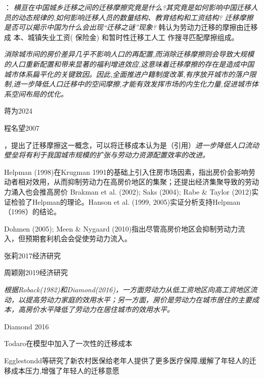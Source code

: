 \documentclass[a4paper,10pt]{article}
\begin{document}
\cite{HanQiHengNongCunLaoDongLiQianYiMoCaYingXiangNongMinGongShuLiangYuGongZiJieGouMa2018}：
\textit{横亘在中国城乡迁移之间的迁移摩擦究竟是什么?其究竟是如何影响中国迁移人员的动态规律的,如何影响迁移人员的数量结构、教育结构和工资结构? 迁移摩擦是否可以揭示中国为什么会出现“迁移之谜”现象?}
韩认为劳动力迁移的摩擦由迁移成 本、城镇失业工资( 保险金) 和暂时性迁移工人工 作搜寻匹配摩擦组成。

\cite{LiuXiuYanFangJieQianYiMoCaYuZhongGuoChengShiDeGuiMoFenBuLiLunMoXingYuJieGouShiGuJi2017}
\textit{消除城市间的房价差异几乎不影响人口的再配置,而消除迁移摩擦则会导致大规模的人口重新配置和带来显著的福利增进效应,这意味着迁移摩擦的存在是造成中国城市体系扁平化的关键致因。因此,全面推进户籍制度改革,有序放开城市的落户限制,进一步降低人口迁移中的空间摩擦,才能有效发挥市场的内生化力量,促进城市体系空间布局的优化。}


蒋为2024

程名望2007

\cite{WangLiLiWoGuoRenKouQianYiChengBenChengShiGuiMoYuShengChanLu2020}，\cite{WangLiLiTuDiGongGeiFangJieYuLaoDongLiKongJianPeiZhiXiaoLu2023}提出了迁移摩擦这一概念，可以将迁移成本认为是（引用）\textit{进一步降低人口流动壁垒将有利于我国城市规模的扩张与劳动力资源配置效率的改进。}

Helpman (1998)在Krugman 1991的基础上引入住房市场因素，指出房价会影响劳动者相对效用，从而抑制劳动力在高房价地区的集聚；还提出经济集聚导致的劳动力涌入也会推高房价
Brakman et al. (2002); Saks (2004); Rabe \& Taylor (2012)实证检验了Helpman的理论。Hanson et al. (1999, 2005)实证分析支持Helpman（1998）的结论。

Dohmen (2005); Meen \& Nygaard (2010)指出尽管高房价地区会抑制劳动力流入，但预期套利机会会促使劳动力流入。

张莉2017经济研究\cite{ZhangLiFangJieRuHeYingXiangLaoDongLiLiuDong2017}

周颖刚2019经济研究\cite{ZhouYingGangGaoFangJieJiChuLiaoShuiJiYuZhongGuoLiuDongRenKouDeWeiGuanShiJiao2019}

\textit{根据Roback(1982)和Diamond(2016)，一方面劳动力从低工资地区向高工资地区流动，以提高劳动力家庭的效用水平；另一方面，房价是劳动力在城市居住的主要成本，高房价水平降低了劳动力在居住城市的效用水平。}

Diamond 2016\cite{diamondDeterminantsWelfareImplications2016}

Todaro在模型中加入了一次性的迁移成本

Egglestondd等研究了新农村医保给老年人提供了更多医疗保障,缓解了年轻人的迁移成本压力,增强了年轻人的迁移意愿
\end{document}
